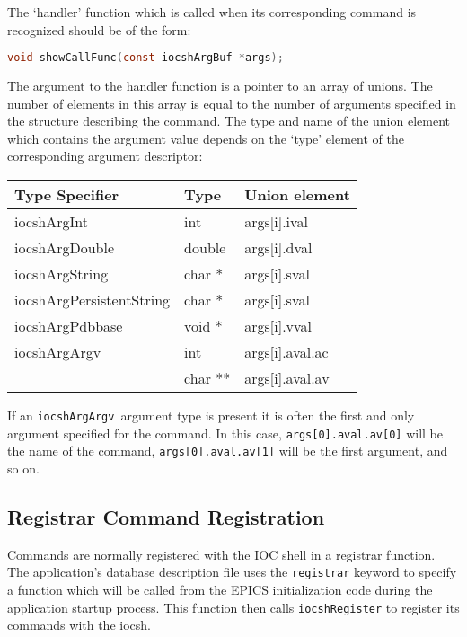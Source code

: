 The `handler' function which is called when its corresponding command is recognized should be of the form:

\begin{lstlisting}[language=C]
void showCallFunc(const iocshArgBuf *args);
\end{lstlisting}

The argument to the handler function is a pointer to an array of unions.
The number of elements in this array is equal to the number of arguments specified in the structure describing the command.
The type and name of the union element which contains the argument value depends on the `type' element of the corresponding argument descriptor:

\begin{center}
\begin{longtable}
{p{1.45833in}p{0.56in}p{1.19in}}
Type Specifier & Type & Union element\\
\hline
iocshArgInt & int & args[i].ival\\
iocshArgDouble & double & args[i].dval\\
iocshArgString  & char * & args[i].sval\\
iocshArgPersistentString & char * & args[i].sval\\
iocshArgPdbbase & void * & args[i].vval\\
iocshArgArgv & int & args[i].aval.ac \\
 & char ** & args[i].aval.av
\end{longtable}
\end{center}

If an \verb|iocshArgArgv |argument type is present it is often the first and only argument specified for the command.
In this case, \verb|args[0].aval.av[0]| will be the name of the command, \verb|args[0].aval.av[1]| will be the first argument, and so on.

\subsection{Registrar Command Registration}

Commands are normally registered with the IOC shell in a registrar function.
The application's database description file uses the \verb|registrar| keyword to specify a function which will be called from the EPICS initialization code during the application startup process.
This function then calls \verb|iocshRegister| to register its commands with the iocsh.

